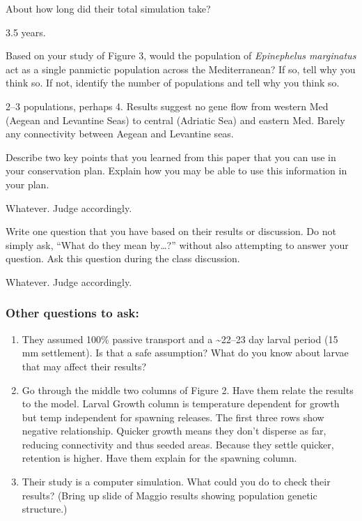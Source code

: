 \documentclass[12pt, addpoints]{exam}
\newcommand*\AnswerBox[2]{%
    \parbox[t][#1]{0.92\textwidth}{%
    \begin{solution}#2\end{solution}}
}
\begin{document}
\begin{questions}
\question[2]
About how long did their total simulation take?

\AnswerBox{\baselineskip}{%
3.5 years. 
}

\question[5]
Based on your study of Figure 3, would the population of \textit{Epinephelus marginatus} act as a single panmictic population across the Mediterranean? If so, tell why you think so. If not, identify the number of populations and tell why you think so.

\AnswerBox{4\baselineskip}{%
2--3 populations, perhaps 4. Results suggest no gene flow from western Med (Aegean and Levantine Seas) to central (Adriatic Sea) and eastern Med. Barely any connectivity between Aegean and Levantine seas.
}

\question[10]
Describe two key points that you learned from this paper that you can use in your conservation plan. Explain how you may be able to use this information in your plan.

\AnswerBox{4\baselineskip}{%
Whatever. Judge accordingly.
}

\question[5]
Write one question that you have based on their results or discussion. Do not simply ask, ``What do they mean by\dots?'' without also attempting to answer your question.  Ask this question during the class discussion.

\AnswerBox{4\baselineskip}{%
Whatever. Judge accordingly.
}

\end{questions}

\ifprintanswers

\newpage

\subsubsection*{Other questions to ask:}

\begin{enumerate}[label=\alph*.]

	\item They assumed 100\% passive transport and a \textasciitilde22–23 day larval period (15 mm settlement). Is that a safe assumption? What do you know about larvae that may affect their results?
	
	\item Go through the middle two columns of Figure 2. Have them relate the results to the model. Larval Growth column is temperature dependent for growth but temp independent for spawning releases. The first three rows show negative relationship. Quicker growth means they don't disperse as far, reducing connectivity and thus seeded areas. Because they settle quicker, retention is higher. Have them explain for the spawning column. 

	\item Their study is a computer simulation. What could you do to check their results? (Bring up slide of Maggio results showing population genetic structure.)
	
\end{enumerate}

\fi
\end{document}
